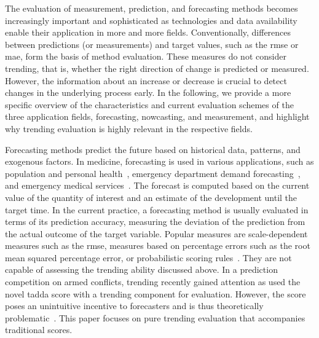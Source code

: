 The evaluation of measurement, prediction, and forecasting methods becomes increasingly important and sophisticated as technologies and data availability enable their application in more and more fields. 
Conventionally, differences between predictions (or measurements) and target values, such as the \ac{rmse} or \ac{mae}, form the basis of method evaluation. 
These measures do not consider trending, that is, whether the right direction of change is predicted or measured.
However, the information about an increase or decrease is crucial to detect changes in the underlying process early. 
In the following, we provide a more specific overview of the characteristics and current evaluation schemes of the three application fields, forecasting, nowcasting, and measurement, and highlight why trending evaluation is highly relevant in the respective fields.

Forecasting methods predict the future based on historical data, patterns, and exogenous factors. 
In medicine, forecasting is used in various applications, such as population and personal health~\parencite[see, e.g., the review in]{Soyiri2013}, emergency department demand forecasting~\parencite{Jones2008,Rostami-Tabar2023}, and emergency medical services~\parencite{HaugsboHermansen2021}.
The forecast is computed based on the current value of the quantity of interest and an estimate of the development until the target time.
In the current practice, a forecasting method is usually evaluated in terms of its prediction accuracy, measuring the deviation of the prediction from the actual outcome of the target variable. 
Popular measures are scale-dependent measures such as the \ac{rmse}, measures based on percentage errors such as the root mean squared percentage error, or probabilistic scoring rules~\citep[see the review in][]{hyndman2006another}.
They are not capable of assessing the trending ability discussed above.
In a prediction competition on armed conflicts, trending recently gained attention as \citet{Vesco2022} used the novel \ac{tadda} score with a trending component for evaluation. 
However, the score poses an unintuitive incentive to forecasters and is thus theoretically problematic~\parencite{Bracher2023}.
This paper focuses on pure trending evaluation that accompanies traditional scores.

